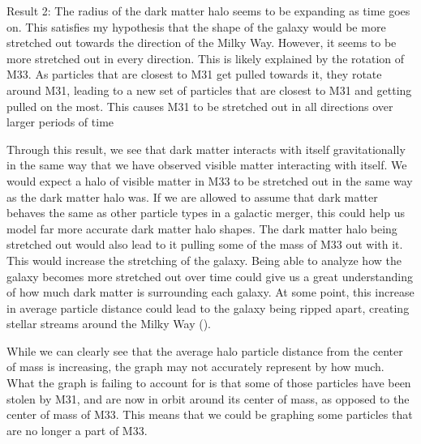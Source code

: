 \documentclass[fleqn,usenatbib]{mnras}
\begin{document}
Result 2:
	The radius of the dark matter halo seems to be expanding as time goes on. This satisfies my hypothesis that the shape of the galaxy would be more stretched out towards the direction of the Milky Way. However, it seems to be more stretched out in every direction. This is likely explained by the rotation of M33. As particles that are closest to M31 get pulled towards it, they rotate around M31, leading to a new set of particles that are closest to M31 and getting pulled on the most. This causes M31 to be stretched out in all directions over larger periods of time


    Through this result, we see that dark matter interacts with itself gravitationally in the same way that we have observed visible matter interacting with itself. We would expect a halo of visible matter in M33 to be stretched out in the same way as the dark matter halo was. If we are allowed to assume that dark matter behaves the same as other particle types in a galactic merger, this could help us model far more accurate dark matter halo shapes. The dark matter halo being stretched out would also lead to it pulling some of the mass of M33 out with it. This would increase the stretching of the galaxy. Being able to analyze how the galaxy becomes more stretched out over time could give us a great understanding of how much dark matter is surrounding each galaxy. At some point, this increase in average particle distance could lead to the galaxy being ripped apart, creating stellar streams around the Milky Way (\citet{Banik2018}).

	While we can clearly see that the average halo particle distance from the center of mass is increasing, the graph may not accurately represent by how much. What the graph is failing to account for is that some of those particles have been stolen by M31, and are now in orbit around its center of mass, as opposed to the center of mass of M33. This means that we could be graphing some particles that are no longer a part of M33. 




 
\cite{}
\label{lastpage}
\end{document}
